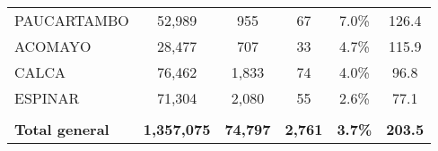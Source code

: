 \begin{tabular}{lccccc}
	\cellcolor[HTML]{FFE699}PAUCARTAMBO                             & 52,989               & 955                        & 67                   & 7.0\%                      & 126.4                                       \\
	\cellcolor[HTML]{FFE699}ACOMAYO                                 & 28,477               & 707                        & 33                   & 4.7\%                      & 115.9                                       \\
	\cellcolor[HTML]{FFE699}CALCA                                   & 76,462               & 1,833                      & 74                   & 4.0\%                      & 96.8                                        \\
	\cellcolor[HTML]{FFE699}ESPINAR                                 & 71,304               & 2,080                      & 55                   & 2.6\%                      & 77.1                                        \\
	& \multicolumn{1}{l}{} & \multicolumn{1}{l}{}       & \multicolumn{1}{l}{} & \multicolumn{1}{l}{}       & \multicolumn{1}{l}{}                        \\
	\rowcolor[HTML]{DDEBF7} 
	\textbf{Total general}                                          & \textbf{1,357,075}   & \textbf{74,797}            & \textbf{2,761}       & \textbf{3.7\%}             & \textbf{203.5}                             
\end{tabular}
 